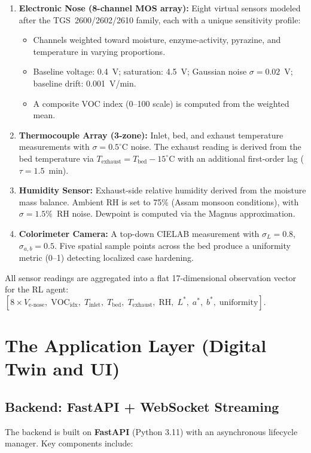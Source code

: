 ﻿\documentclass[12pt, a4paper]{report}
\begin{document}
\begin{enumerate}
    \item \textbf{Electronic Nose (8-channel MOS array):} Eight virtual sensors modeled after the TGS~2600/2602/2610 family, each with a unique sensitivity profile:\
    \begin{itemize}
        \item Channels weighted toward moisture, enzyme-activity, pyrazine, and temperature in varying proportions.
        \item Baseline voltage: 0.4~V; saturation: 4.5~V; Gaussian noise $\sigma = 0.02$~V; baseline drift: 0.001~V/min.
        \item A composite VOC index (0--100 scale) is computed from the weighted mean.
    \end{itemize}

    \item \textbf{Thermocouple Array (3-zone):} Inlet, bed, and exhaust temperature measurements with $\sigma = 0.5^\circ$C noise. The exhaust reading is derived from the bed temperature via $T_{\text{exhaust}} = T_{\text{bed}} - 15^\circ$C with an additional first-order lag ($\tau = 1.5$~min).

    \item \textbf{Humidity Sensor:} Exhaust-side relative humidity derived from the moisture mass balance. Ambient RH is set to 75\% (Assam monsoon conditions), with $\sigma = 1.5\%$~RH noise. Dewpoint is computed via the Magnus approximation.

    \item \textbf{Colorimeter Camera:} A top-down CIELAB measurement with $\sigma_L = 0.8$, $\sigma_{a,b} = 0.5$. Five spatial sample points across the bed produce a uniformity metric (0--1) detecting localized case hardening.
\end{enumerate}

All sensor readings are aggregated into a flat 17-dimensional observation vector for the RL agent: $[8 \times V_{\text{e-nose}},\; \text{VOC}_{\text{idx}},\; T_{\text{inlet}},\; T_{\text{bed}},\; T_{\text{exhaust}},\; \text{RH},\; L^*,\; a^*,\; b^*,\; \text{uniformity}]$.


\section{The Application Layer (Digital Twin and UI)}

\subsection{Backend: FastAPI + WebSocket Streaming}
The backend is built on \textbf{FastAPI} (Python 3.11) with an asynchronous lifecycle manager. Key components include:
\end{document}
